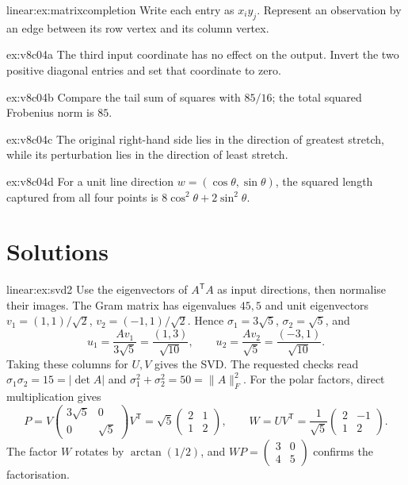 \begin{hint}{linear:ex:matrixcompletion}
Write each entry as $x_iy_j$. Represent an observation by an edge between its row vertex and its column vertex.
\end{hint}
\begin{hint}{ex:v8c04a}
The third input coordinate has no effect on the output. Invert the two positive diagonal entries and set that coordinate to zero.
\end{hint}
\begin{hint}{ex:v8c04b}
Compare the tail sum of squares with $85/16$; the total squared Frobenius norm is $85$.
\end{hint}
\begin{hint}{ex:v8c04c}
The original right-hand side lies in the direction of greatest stretch, while its perturbation lies in the direction of least stretch.
\end{hint}
\begin{hint}{ex:v8c04d}
For a unit line direction $w=(\cos\theta,\sin\theta)$, the squared length captured from all four points is $8\cos^2\theta+2\sin^2\theta$.
\end{hint}

\section{Solutions}

\begin{solution}{linear:ex:svd2}
\idea Use the eigenvectors of $A^{\mathsf T}A$ as input directions, then normalise their images.
\writeup The Gram matrix has eigenvalues $45,5$ and unit eigenvectors $v_1=(1,1)/\sqrt2$, $v_2=(-1,1)/\sqrt2$. Hence $\sigma_1=3\sqrt5$, $\sigma_2=\sqrt5$, and
\[
u_1=\frac{Av_1}{3\sqrt5}=\frac{(1,3)}{\sqrt{10}},\qquad
u_2=\frac{Av_2}{\sqrt5}=\frac{(-3,1)}{\sqrt{10}}.
\]
Taking these columns for $U,V$ gives the SVD. The requested checks read $\sigma_1\sigma_2=15=|\det A|$ and $\sigma_1^2+\sigma_2^2=50=\|A\|_F^2$.
For the polar factors, direct multiplication gives
\[
P=V\begin{pmatrix}3\sqrt5&0\\0&\sqrt5\end{pmatrix}V^{\mathsf T}
=\sqrt5\begin{pmatrix}2&1\\1&2\end{pmatrix},\qquad
W=UV^{\mathsf T}=\frac1{\sqrt5}\begin{pmatrix}2&-1\\1&2\end{pmatrix}.
\]
The factor $W$ rotates by $\arctan(1/2)$, and $WP=\begin{pmatrix}3&0\\4&5\end{pmatrix}$ confirms the factorisation.
\end{solution}

